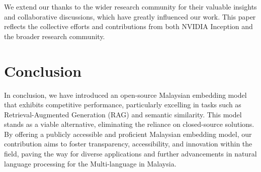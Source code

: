 \documentclass[preprint]{article}
\begin{document}
We extend our thanks to the wider research community for their valuable insights and collaborative discussions, which have greatly influenced our work. This paper reflects the collective efforts and contributions from both NVIDIA Inception and the broader research community.

\section{Conclusion}

In conclusion, we have introduced an open-source Malaysian embedding model that exhibits competitive performance, particularly excelling in tasks such as Retrieval-Augmented Generation (RAG) and semantic similarity. This model stands as a viable alternative, eliminating the reliance on closed-source solutions. By offering a publicly accessible and proficient Malaysian embedding model, our contribution aims to foster transparency, accessibility, and innovation within the field, paving the way for diverse applications and further advancements in natural language processing for the Multi-language in Malaysia.

{}

\end{document}
